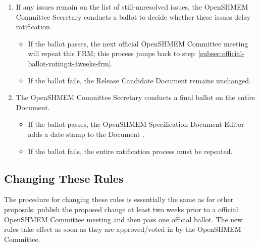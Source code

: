 \begin{enumerate}
\begin{enumerate}
    \item If any issues remain on the list of still-unresolved issues,
      the OpenSHMEM Committee Secretary conducts a ballot to decide whether
      these issues delay ratification.
      \begin{itemize}
      \item If the ballot passes, the next official OpenSHMEM Committee meeting
        will repeat this FRM; this process jumps back to
        step~\ref{subsec:official-ballot-voting:t-4weeks-frm}.
      \item If the ballot fails, the Release Candidate Document
        remains unchanged.
      \end{itemize}
    \item The OpenSHMEM Committee Secretary conducts a final ballot on the
      entire Document.
      \begin{itemize}
      \item If the ballot passes, the OpenSHMEM Specification Document Editor adds
        a date stamp to the Document%
        .
      \item If the ballot fails, the entire ratification process must be
        repeated.
      \end{itemize}
  \end{enumerate}
\end{enumerate}


\subsection{Changing These Rules}

The procedure for changing these rules is essentially the same as for
other proposals: publish the proposed change at least two weeks prior
to a official OpenSHMEM Committee meeting and then pass one official ballot.
The new rules take effect as soon as they are approved/voted in by the
OpenSHMEM Committee.


